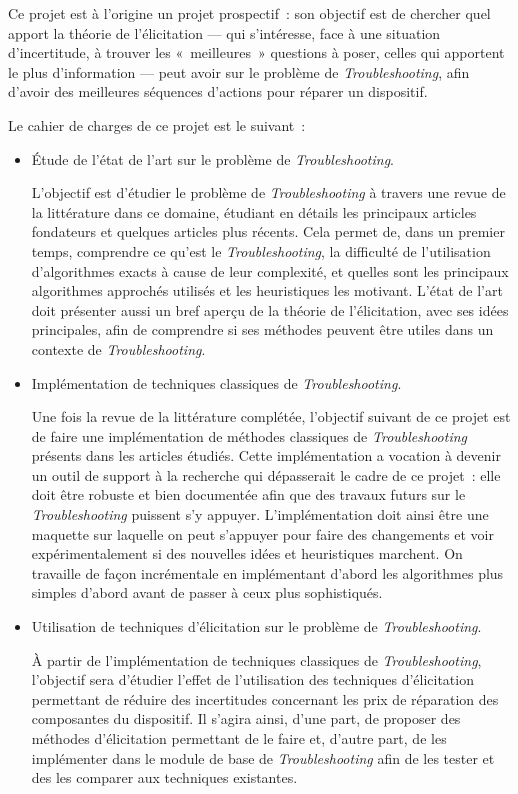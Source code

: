 \documentclass[a4paper,11pt]{article}
\theoremstyle{plain}
\begin{document}
Ce projet est à l'origine un projet prospectif~: son objectif est de chercher quel apport la théorie de l'élicitation --- qui s'intéresse, face à une situation d'incertitude, à trouver les «~meilleures~» questions à poser, celles qui apportent le plus d'information --- peut avoir sur le problème de \emph{Troubleshooting}, afin d'avoir des meilleures séquences d'actions pour réparer un dispositif.

Le cahier de charges de ce projet est le suivant~:
\begin{itemize}
\item Étude de l'état de l'art sur le problème de \emph{Troubleshooting}.

L'objectif est d'étudier le problème de \emph{Troubleshooting} à travers une revue de la littérature dans ce domaine, étudiant en détails les principaux articles fondateurs et quelques articles plus récents. Cela permet de, dans un premier temps, comprendre ce qu'est le \emph{Troubleshooting}, la difficulté de l'utilisation d'algorithmes exacts à cause de leur complexité, et quelles sont les principaux algorithmes approchés utilisés et les heuristiques les motivant. L'état de l'art doit présenter aussi un bref aperçu de la théorie de l'élicitation, avec ses idées principales, afin de comprendre si ses méthodes peuvent être utiles dans un contexte de \emph{Troubleshooting}.

\item Implémentation de techniques classiques de \emph{Troubleshooting}.

Une fois la revue de la littérature complétée, l'objectif suivant de ce projet est de faire une implémentation de méthodes classiques de \emph{Troubleshooting} présents dans les articles étudiés. Cette implémentation a vocation à devenir un outil de support à la recherche qui dépasserait le cadre de ce projet~: elle doit être robuste et bien documentée afin que des travaux futurs sur le \emph{Troubleshooting} puissent s'y appuyer. L'implémentation doit ainsi être une maquette sur laquelle on peut s'appuyer pour faire des changements et voir expérimentalement si des nouvelles idées et heuristiques marchent. On travaille de façon incrémentale en implémentant d'abord les algorithmes plus simples d'abord avant de passer à ceux plus sophistiqués.

\item Utilisation de techniques d'élicitation sur le problème de \emph{Troubleshooting}.

À partir de l'implémentation de techniques classiques de \emph{Troubleshooting}, l'objectif sera d'étudier l'effet de l'utilisation des techniques d'élicitation permettant de réduire des incertitudes concernant les prix de réparation des composantes du dispositif. Il s'agira ainsi, d'une part, de proposer des méthodes d'élicitation permettant de le faire et, d'autre part, de les implémenter dans le module de base de \emph{Troubleshooting} afin de les tester et des les comparer aux techniques existantes.


\end{itemize}
\end{document}
